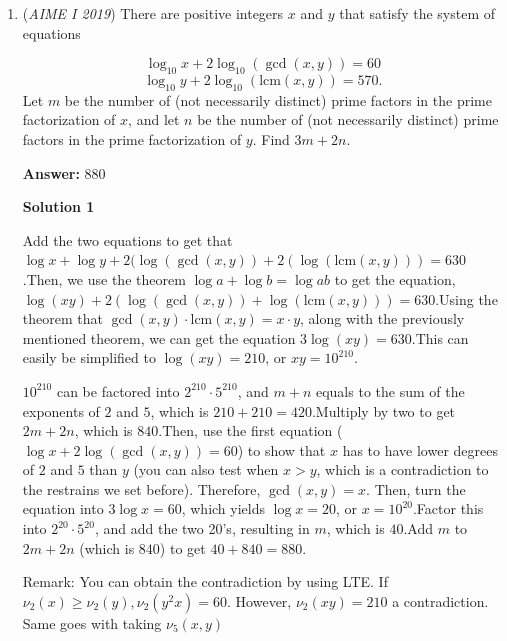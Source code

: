 \begin{enumerate}
 
 \[\frac{KO}{KN} = \frac{KP}{KM}\]

 \[\frac{8}{\sqrt{KM^2 + 65^2}} = \frac{\frac{28^2}{\sqrt{KM^2 + 65^2}}}{KM}\]

 Multiplying both sides by $\sqrt{KM^2 + 65^2}$:

 
 \[8 = \frac{28^2}{KM}\]

 \[KM = 98\]

 Therefore, $OM = 98-8 = \boxed{90}$



	\item (\textit{AIME I 2019}) There are positive integers $x$ and $y$ that satisfy the system of equations

 \[\log_{10} x + 2 \log_{10} (\gcd(x,y)) = 60\] 
 \[\log_{10} y + 2 \log_{10} (\text{lcm}(x,y)) = 570.\]
Let $m$ be the number of (not necessarily distinct) prime factors in the prime factorization of $x$, and let $n$ be the number of (not necessarily distinct) prime factors in the prime factorization of $y$. Find $3m+2n$.


 
 \textbf{Answer: }880



\textbf{Solution 1}

Add the two equations to get that $\log x+\log y+2(\log(\gcd(x,y))+2(\log(\text{lcm}(x,y)))=630$.Then, we use the theorem $\log a+\log b=\log ab$ to get the equation, $\log (xy)+2(\log(\gcd(x,y))+\log(\text{lcm}(x,y)))=630$.Using the theorem that $\gcd(x,y) \cdot \text{lcm}(x,y)=x\cdot y$, along with the previously mentioned theorem, we can get the equation $3\log(xy)=630$.This can easily be simplified to $\log(xy)=210$, or $xy = 10^{210}$.

 $10^{210}$ can be factored into $2^{210} \cdot 5^{210}$, and $m+n$ equals to the sum of the exponents of $2$ and $5$, which is $210+210 = 420$.Multiply by two to get $2m +2n$, which is $840$.Then, use the first equation ($\log x + 2\log(\gcd(x,y)) = 60$) to show that $x$ has to have lower degrees of $2$ and $5$ than $y$  (you can also test when $x>y$, which is a contradiction to the restrains we set before). Therefore, $\gcd(x,y)=x$. Then, turn the equation into $3\log x = 60$, which yields $\log x = 20$, or $x = 10^{20}$.Factor this into $2^{20} \cdot 5^{20}$, and add the two 20's, resulting in $m$, which is $40$.Add $m$ to $2m + 2n$ (which is $840$) to get $40+840 = \boxed{880}$.

 Remark: You can obtain the contradiction by using LTE. If $\nu_2{(x)}\geq{\nu_2{(y)}}, \nu_2{(y^2x)}=60$. However, $\nu_2{(xy)}=210$ a contradiction. Same goes with taking $\nu_5{(x,y)}$


\end{enumerate}
